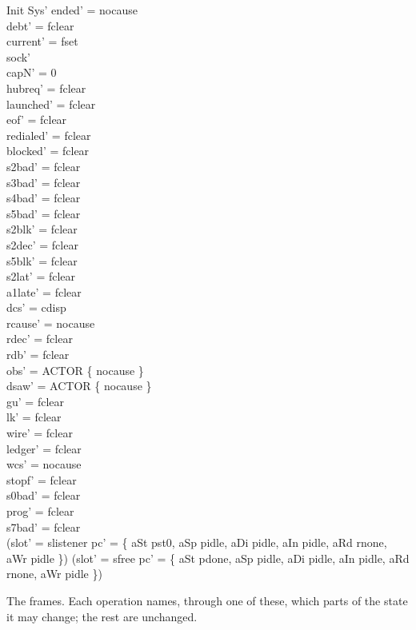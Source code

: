 \documentclass[a4paper,10pt,fleqn]{article}
\begin{document}
\begin{schema}{Init}
  Sys'
\where
  ended' = nocause \\
  debt' = fclear \\
  current' = fset \\
  sock'   \\
  capN' = 0 \\
  hubreq' = fclear \\
  launched' = fclear \\
  eof' = fclear \\
  redialed' = fclear \\
  blocked' = fclear \\
  s2bad' = fclear \\
  s3bad' = fclear \\
  s4bad' = fclear \\
  s5bad' = fclear \\
  s2blk' = fclear \\
  s2dec' = fclear \\
  s5blk' = fclear \\
  s2lat' = fclear \\
  a1late' = fclear \\
  dcs' = cdisp \\
  rcause' = nocause \\
  rdec' = fclear \\
  rdb' = fclear \\
  obs' = ACTOR \cross \{ nocause \} \\
  dsaw' = ACTOR \cross \{ nocause \} \\
  gu' = fclear \\
  lk' = fclear \\
  wire' = fclear \\
  ledger' = fclear \\
  wcs' = nocause \\
  stopf' = fclear \\
  s0bad' = fclear \\
  prog' = fclear \\
  s7bad' = fclear \\
  (slot' = slistener \land pc' = \{ aSt \mapsto pst0, aSp \mapsto pidle,
    aDi \mapsto pidle, aIn \mapsto pidle, aRd \mapsto rnone, aWr \mapsto pidle \}) \lor
  (slot' = sfree \land pc' = \{ aSt \mapsto pdone, aSp \mapsto pidle,
    aDi \mapsto pidle, aIn \mapsto pidle, aRd \mapsto rnone, aWr \mapsto pidle \})
\end{schema}

The frames.  Each operation names, through one of these, which parts of the
state it may change; the rest are unchanged.
\end{document}

